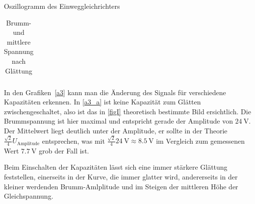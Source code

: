 \documentclass{article}
\theoremstyle{definition}
\begin{document}
\begin{aufgabe}{Oszillogramm des Einweggleichrichters}
\begin{table}[H]
\begin{tabular}{|l|l|l|l|}
            \hline
        \end{tabular}
        \caption{Brumm- und mittlere Spannung nach Glättung}
    \end{table}
    \auswertung
    In den Grafiken~\ref{a3} kann man die Änderung des Signals für verschiedene Kapazitäten erkennen. In \ref{a3_a} ist keine Kapazität zum Glätten zwischengeschaltet, also ist das in \ref{figI} theoretisch bestimmte Bild ersichtlich. Die Brummspannung ist hier maximal und entspricht gerade der Amplitude von $\SI{24}{\volt}$. Der Mittelwert liegt deutlich unter der Amplitude, er sollte in der Theorie $\frac{\sqrt{2}}{4} U_\mathrm{Amplitude}$ entsprechen, was mit $\frac{\sqrt{2}}{4} \SI{24}{\volt} \approx \SI{8.5}{\volt}$ im Vergleich zum gemessenen Wert $\SI{7.7}{\volt}$ grob der Fall ist.

    Beim Einschalten der Kapazitäten lässt sich eine immer stärkere Glättung feststellen, einerseits in der Kurve, die immer glatter wird, andererseits in der kleiner werdenden Brumm-Amlplitude und im Steigen der mittleren Höhe der Gleichspannung.
\end{aufgabe}
\end{document}
